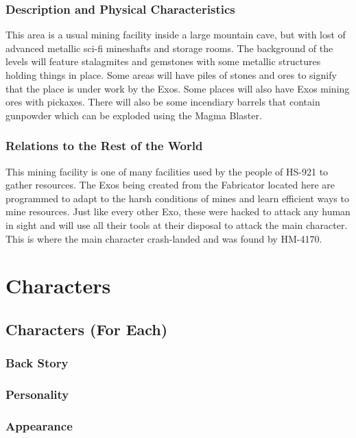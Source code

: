 \documentclass[12pt]{article}
\begin{document}
\subsubsection{Description and Physical Characteristics}

This area is a usual mining facility inside a large mountain cave, but with lost of advanced metallic sci-fi mineshafts and storage rooms. The background of the levels will feature stalagmites and gemstones with some metallic structures holding things in place. Some areas will have piles of stones and ores to signify that the place is under work by the Exos. Some places will also have Exos mining ores with pickaxes. There will also be some incendiary barrels that contain gunpowder which can be exploded using the Magma Blaster. 

\subsubsection{Relations to the Rest of the World}

This mining facility is one of many facilities used by the people of HS-921 to gather resources. The Exos being created from the Fabricator located here are programmed to adapt to the harsh conditions of mines and learn efficient ways to mine resources. Just like every other Exo, these were hacked to attack any human in sight and will use all their tools at their disposal to attack the main character. This is where the main character crash-landed and was found by HM-4170.

\section{Characters}

\subsection{Characters (For Each)}

\subsubsection{Back Story}

\subsubsection{Personality}

\subsubsection{Appearance}
\end{document}
